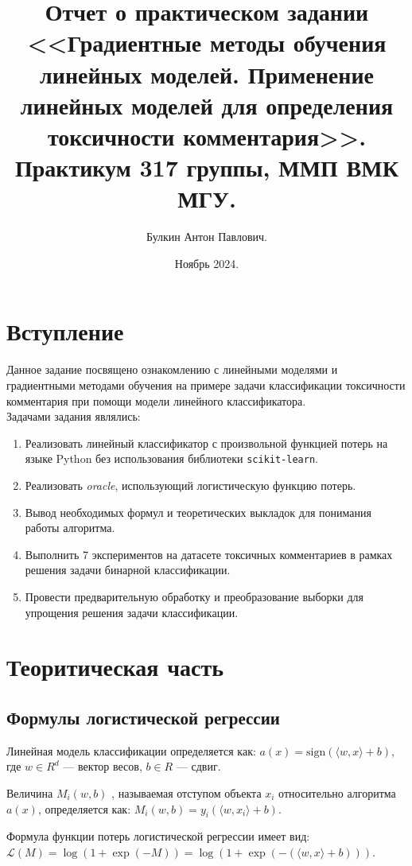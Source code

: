 \documentclass[14pt]{extarticle}
\title{Отчет о практическом задании \\ <<Градиентные методы обучения линейных моделей. Применение линейных моделей для определения токсичности комментария>>.\\[6mm] \large Практикум 317 группы, ММП ВМК МГУ.}
\author{Булкин Антон Павлович.}
\date{Ноябрь 2024.}
\begin{document}
\maketitle
\tableofcontents

\section{Вступление}

Данное задание посвящено ознакомлению с линейными моделями и градиентными методами обучения на примере задачи классификации токсичности комментария при помощи модели линейного классификатора. \\
Задачами задания являлись:
\begin{enumerate}
 \item Реализовать линейный классификатор с произвольной функцией потерь на языке Python без использования библиотеки \verb|scikit-learn|.
 \item Реализовать \textit{oracle}, использующий логистическую функцию потерь.
 \item Вывод необходимых формул и теоретических выкладок для понимания работы алгоритма.
 \item Выполнить 7 экспериментов на датасете токсичных комментариев в рамках решения задачи бинарной классификации.
 \item Провести предварительную обработку и преобразование выборки для упрощения решения задачи классификации.
\end{enumerate}

\section{Теоритическая часть}

\subsection{Формулы логистической регрессии}

Линейная модель классификации определяется как: $ a(x) = \text{sign}(\langle w, x \rangle + b), $ где \(w \in R^d\) — вектор весов, \(b \in R\) — сдвиг.

Величина $M_i(w, b)$ , называемая отступом объекта \( x_i \) относительно алгоритма \( a(x) \), определяется как: \( M_i(w, b) = y_i (\langle w, x_i \rangle + b) \).

Формула функции потерь логистической регрессии имеет вид: \\ $\mathcal{L}(M) = \log(1 + \exp(-M)) = \log(1 + \exp(-(\langle w, x \rangle + b)))$.
\end{document}
